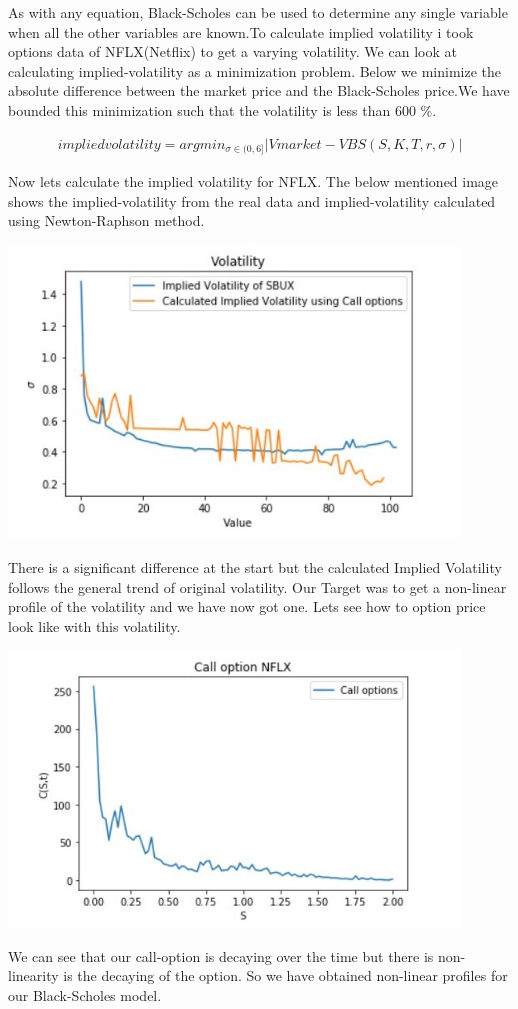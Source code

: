 \documentclass[12pt]{article}
\begin{document}
 As with any equation, Black-Scholes can be used to determine any single variable when all the other variables are known.To calculate implied volatility i took options data of NFLX(Netflix) to get a varying volatility. We can look at calculating implied-volatility as a minimization problem. Below we minimize the absolute difference between the market price and the Black-Scholes price.We have bounded this minimization such that the volatility is less than 600 \%.
 
 
\begin{align}
	implied volatility=argmin_{\sigma \in(0,6]} |Vmarket  - VBS(S,K,T,r,\sigma)|
\end{align}

Now lets calculate the implied volatility for NFLX. The below mentioned image shows the implied-volatility from the real data and implied-volatility calculated using Newton-Raphson method. \cite{bworld}

\includegraphics[width=12cm]{p6}

There is a significant difference at the start but the calculated Implied Volatility follows the general trend of original volatility. Our Target was to get a non-linear profile of the volatility and we have now got one. Lets see how to option price look like with this volatility. 

\includegraphics[width=12cm]{p7}

We can see that our call-option is decaying over the time but there is non-linearity is the decaying of the option. So we have obtained non-linear profiles for our Black-Scholes model.




	


	
	
\end{document}
